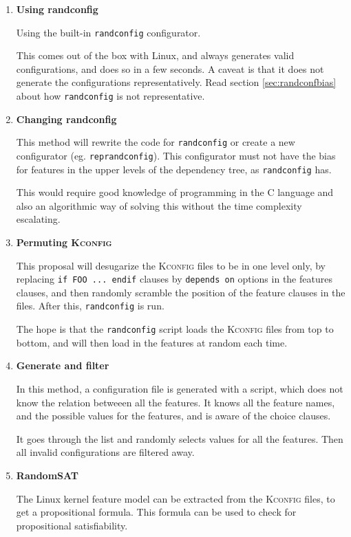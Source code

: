 \documentclass[a4paper,11pt]{report}
\newcommand{\textcode}[1]{\fboxsep=1pt\texttt{\colorbox{gray!20}{#1}}}
\begin{document}
\begin{enumerate}

    \item \textbf{Using randconfig}

Using the built-in \texttt{randconfig} configurator.

This comes out of the box with Linux, and always generates valid configurations,
and does so in a few seconds. A caveat is that it does not generate the 
configurations representatively. Read section \ref{sec:randconfbias} about how 
\texttt{randconfig} is not representative.


    \item \textbf{Changing randconfig}

This method will rewrite the code for \texttt{randconfig} or create a new 
configurator (eg. \texttt{reprandconfig}).  This configurator must not have the 
bias for features in the upper levels of the dependency tree, as 
\texttt{randconfig} has.

This would require good knowledge of programming in the \textsc{C} language
and also an algorithmic way of solving this without the time complexity 
escalating.


    \item \textbf{Permuting \textsc{Kconfig}}


This proposal will desugarize the \textsc{Kconfig} files to be in one level 
only, by replacing \textcode{if FOO ... endif} clauses by \textcode{depends on} 
options in the features clauses, and then randomly scramble the position of 
the feature clauses in the files. After this, \texttt{randconfig} is run.

The hope is that the \texttt{randconfig} script loads the \textsc{Kconfig} 
files from top to bottom, and will then load in the features at random each 
time.


    \item \textbf{Generate and filter}

            \def \fn {It also is aware about \texttt{choice} clauses}

In this method, a configuration file is generated with a script, which 
does not know the relation betweeen all the features. It knows all the feature
names, and the possible values for the features, and is aware of the choice 
clauses.

It goes through the list and randomly selects values for all the features. Then 
all invalid configurations are filtered away.


    \item \textbf{RandomSAT}

The Linux kernel feature model can be extracted from the \textsc{Kconfig} 
files, to get a propositional formula\cite{lvat}. This formula can be used to 
check for propositional satisfiability.


    
\end{enumerate}
\end{document}
